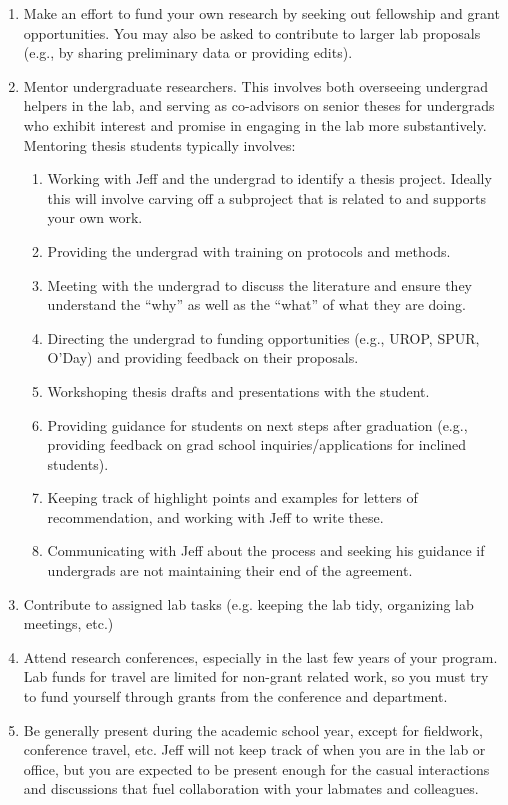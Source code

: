 \documentclass[12pt]{article}
\begin{document}
\begin{enumerate}
\item Make an effort to fund your own research by seeking out fellowship and grant opportunities. You may also be asked to contribute to larger lab proposals (e.g., by sharing preliminary data or providing edits).
  
\item Mentor undergraduate researchers. This involves both overseeing undergrad helpers in the lab, and serving as co-advisors on senior theses for undergrads who exhibit interest and promise in engaging in the lab more substantively. Mentoring thesis students typically involves:
\begin{enumerate}
\item Working with Jeff and the undergrad to identify a thesis project. Ideally this will involve carving off a subproject that is related to and supports your own work.
\item Providing the undergrad with training on protocols and methods.
\item Meeting with the undergrad to discuss the literature and ensure they understand the ``why'' as well as the ``what'' of what they are doing.
\item Directing the undergrad to funding opportunities (e.g., UROP, SPUR, O'Day) and providing feedback on their proposals.
\item Workshoping thesis drafts and presentations with the student.
\item Providing guidance for students on next steps after graduation (e.g., providing feedback on grad school inquiries/applications for inclined students).
\item Keeping track of highlight points and examples for letters of recommendation, and working with Jeff to write these.
\item Communicating with Jeff about the process and seeking his guidance if undergrads are not maintaining their end of the agreement.
\end{enumerate}

\item Contribute to assigned lab tasks (e.g. keeping the lab tidy, organizing lab meetings, etc.)

\item Attend research conferences, especially in the last few years of your program. Lab funds for travel are limited for non-grant related work, so you must try to  fund yourself through grants from the conference and department.
  
\item Be generally present during the academic school year, except for fieldwork, conference travel, etc. Jeff will not keep track of when you are in the lab or office, but you are expected to be present enough for the casual interactions and discussions that fuel collaboration with your labmates and colleagues.  


\end{enumerate}
\end{document}
